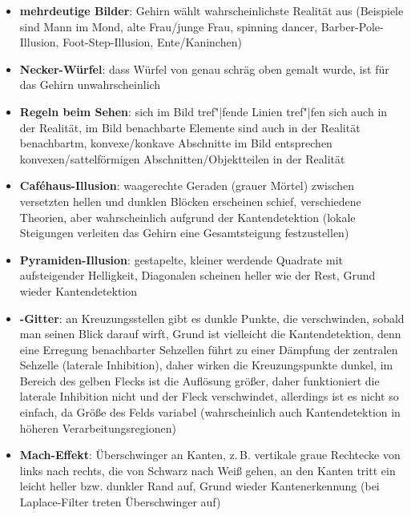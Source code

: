 \linie
\pagebreak
\begin{itemize}
    \item
    \textbf{mehrdeutige Bilder}:
    Gehirn wählt wahrscheinlichste Realität aus
    (Beispiele sind Mann im Mond, alte Frau/junge Frau, spinning dancer,
    Barber-Pole-Illusion, Foot-Step-Illusion, Ente/Kaninchen)

    \item
    \textbf{Necker-Würfel}:
    dass Würfel von genau schräg oben gemalt wurde, ist für das
    Gehirn unwahrscheinlich

    \item
    \textbf{Regeln beim Sehen}:
    sich im Bild tref"|fende Linien tref"|fen sich auch in der Realität,
    im Bild benachbarte Elemente sind auch in der Realität benachbartm,
    konvexe/konkave Abschnitte im Bild entsprechen konvexen/sattelförmigen
    Abschnitten/Objektteilen in der Realität
\end{itemize}
\linie
\begin{itemize}
    \item
    \textbf{Caféhaus-Illusion}:
    waagerechte Geraden (grauer Mörtel) zwischen versetzten hellen und dunklen
    Blöcken erscheinen schief, verschiedene Theorien,
    aber wahrscheinlich aufgrund der Kantendetektion
    (lokale Steigungen verleiten das Gehirn eine Gesamtsteigung festzustellen)

    \item
    \textbf{Pyramiden-Illusion}:
    gestapelte, kleiner werdende Quadrate mit aufsteigender Helligkeit,
    Diagonalen scheinen heller wie der Rest,
    Grund wieder Kantendetektion
\end{itemize}
\linie
\begin{itemize}
    \item
    \textbf{-Gitter}:
    an Kreuzungsstellen gibt es dunkle Punkte, die verschwinden, sobald man
    seinen Blick darauf wirft,
    Grund ist vielleicht die Kantendetektion,
    denn eine Erregung benachbarter Sehzellen führt zu einer Dämpfung
    der zentralen Sehzelle (laterale Inhibition), daher wirken die
    Kreuzungspunkte dunkel,
    im Bereich des gelben Flecks ist die Auflösung größer, daher funktioniert
    die laterale Inhibition nicht und der Fleck verschwindet,
    allerdings ist es nicht so einfach, da Größe des Felds variabel
    (wahrscheinlich auch Kantendetektion in höheren Verarbeitungsregionen)

    \item
    \textbf{Mach-Effekt}:
    Überschwinger an Kanten,
    z.\,B. vertikale graue Rechtecke von links nach rechts, die
    von Schwarz nach Weiß gehen,
    an den Kanten tritt ein leicht heller bzw. dunkler Rand auf,
    Grund wieder Kantenerkennung
    (bei Laplace-Filter treten Überschwinger auf)
\end{itemize}
